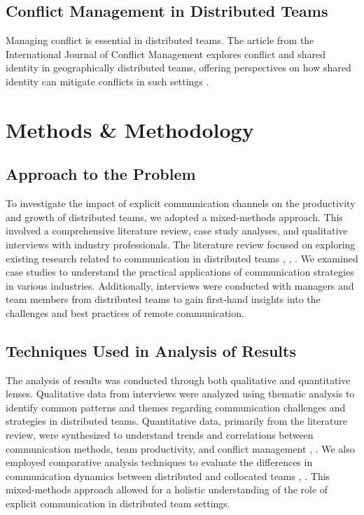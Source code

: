 \documentclass[12pt]{article}
\begin{document}
\subsection{Conflict Management in Distributed Teams}
Managing conflict is essential in distributed teams. The article from the International Journal of Conflict Management explores conflict and shared identity in geographically distributed teams, offering perspectives on how shared identity can mitigate conflicts in such settings \cite{ref10}.

\newpage

\section{Methods \& Methodology}

\subsection{Approach to the Problem}
To investigate the impact of explicit communication channels on the productivity and growth of distributed teams, we adopted a mixed-methods approach. This involved a comprehensive literature review, case study analyses, and qualitative interviews with industry professionals. The literature review focused on exploring existing research related to communication in distributed teams \cite{ref1}, \cite{ref6}, \cite{ref8}. We examined case studies to understand the practical applications of communication strategies in various industries. Additionally, interviews were conducted with managers and team members from distributed teams to gain first-hand insights into the challenges and best practices of remote communication.

\subsection{Techniques Used in Analysis of Results}
The analysis of results was conducted through both qualitative and quantitative lenses. Qualitative data from interviews were analyzed using thematic analysis to identify common patterns and themes regarding communication challenges and strategies in distributed teams. Quantitative data, primarily from the literature review, were synthesized to understand trends and correlations between communication methods, team productivity, and conflict management \cite{ref10}, \cite{ref7}. We also employed comparative analysis techniques to evaluate the differences in communication dynamics between distributed and collocated teams \cite{ref4}, \cite{ref5}. This mixed-methods approach allowed for a holistic understanding of the role of explicit communication in distributed team settings.
\end{document}
